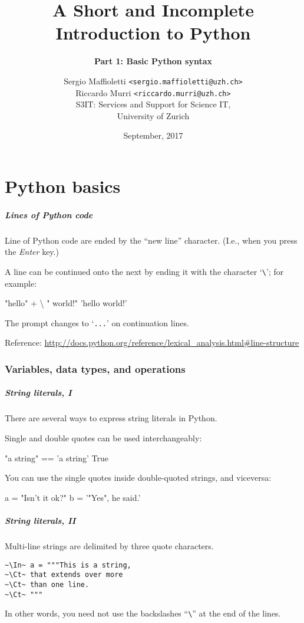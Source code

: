 \documentclass[english,serif,mathserif,xcolor=pdftex,dvipsnames,table]{beamer}
\title[1. Basics]{%
  A Short and Incomplete Introduction to Python
}
\subtitle{\bfseries Part 1: Basic Python syntax}
\author[S.~Maffioletti]{%
  Sergio Maffioletti \texttt{<sergio.maffioletti@uzh.ch>}
  \\
  Riccardo Murri \texttt{<riccardo.murri@uzh.ch>}
  \\
  S3IT: Services and Support for Science IT,
  \\
  University of Zurich
}
\date{September, 2017}
\begin{document}
\maketitle

\part{Python basics}

\begin{frame}[fragile]
  \frametitle{Lines of Python code}
  Line of Python code are ended by the ``new line'' character. (I.e., when you
  press the \emph{Enter} key.)

  \+
  A line can be continued onto the next by ending it with the
  character `\texttt{\textbackslash}'; for example:
\begin{semiverbatim}
\In "hello" + \textbackslash
\Ct " world!"
\Out 'hello world!'
\end{semiverbatim}
  The prompt changes to `\texttt{...}' on continuation lines.

  \+\scriptsize
  Reference:
  \url{http://docs.python.org/reference/lexical_analysis.html#line-structure}
\end{frame}


\section{Variables, data types, and operations}

\begin{frame}[fragile]
  \frametitle{String literals, I}
  There are several ways to express string literals in Python.

  \+
  Single and double quotes can be used interchangeably:
\begin{semiverbatim}
\In "a string" == 'a string'
\Out True
\end{semiverbatim}

  \+
  You can use the single quotes inside double-quoted strings, and viceversa:
\begin{semiverbatim}
\In a = "Isn't it ok?"
\In b = '"Yes", he said.'
\end{semiverbatim}
\end{frame}


\begin{frame}[fragile]
  \frametitle{String literals, II}
  Multi-line strings are delimited by three quote characters.
\begin{lstlisting}[showstringspaces=false]
~\In~ a = """This is a string,
~\Ct~ that extends over more
~\Ct~ than one line.
~\Ct~ """
\end{lstlisting}

  \+ In other words, you need not use the backslashes
  ``\texttt{\textbackslash}'' at the end of the lines.
\end{frame}
\end{document}
